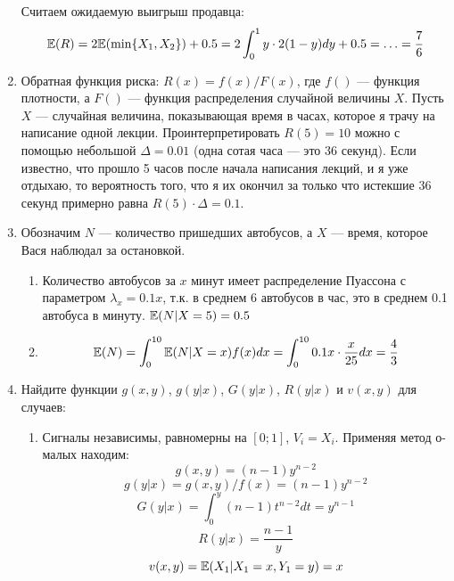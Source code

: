 \begin{enumerate}
Считаем ожидаемую выигрыш продавца:
\begin{equation}
\mathbb{E}(R)=2\mathbb{E}(\min\{X_{1},X_{2}\})+0.5=2\int_{0}^{1}y\cdot 2(1-y)dy+0.5=\ldots=\frac{7}{6}
\end{equation}


\item Обратная функция риска: $ R(x)=f(x)/F(x) $, где $ f() $ --- функция плотности, а $ F() $ --- функция распределения случайной величины $ X $. Пусть $ X $ --- случайная величина, показывающая время в часах, которое я трачу на написание одной лекции. Проинтерпретировать $ R(5)=10 $ можно с помощью небольшой $ \Delta=0.01 $ (одна сотая часа --- это 36 секунд). Если известно, что прошло 5 часов после начала написания лекций, и я уже отдыхаю, то вероятность того, что я их окончил за только что истекшие 36 секунд примерно равна $ R(5)\cdot \Delta=0.1 $.
\item Обозначим $ N$ --- количество пришедших автобусов, а $ X $ --- время, которое Вася наблюдал за остановкой. 
\begin{enumerate}
\item Количество автобусов за $ x $ минут имеет распределение Пуассона с параметром $ \lambda_{x}=0.1x $, т.к. в среднем 6 автобусов в час, это в среднем 0.1 автобуса в минуту. $ \mathbb{E}(N|X=5)=0.5 $
\item \begin{equation} \mathbb{E}(N)=\int_{0}^{10}\mathbb{E}(N|X=x)f(x)dx=\int_{0}^{10}0.1x\cdot \frac{x}{25} dx=\frac{4}{3} \end{equation}
\end{enumerate}
\item Найдите функции $ g(x,y)$, $ g(y|x)$, $ G(y|x)$,  $R(y|x)$ и $v(x,y)$ для случаев:
\begin{enumerate}
\item Сигналы независимы, равномерны на $ [0;1] $, $ V_{i}=X_{i} $.
Применяя метод о-малых находим:
\begin{equation}
g(x,y)=(n-1)y^{n-2} 
\end{equation}
\begin{equation}
g(y|x)=g(x,y)/f(x)=(n-1)y^{n-2} 
\end{equation}
\begin{equation}
G(y|x)=\int_{0}^{y}(n-1)t^{n-2}dt=y^{n-1} 
\end{equation}
\begin{equation}
R(y|x)=\frac{n-1}{y} 
\end{equation}
\begin{equation}
v(x,y)=\mathbb{E}(X_{1}|X_{1}=x,Y_{1}=y)=x
\end{equation}


\end{enumerate}
\end{enumerate}

